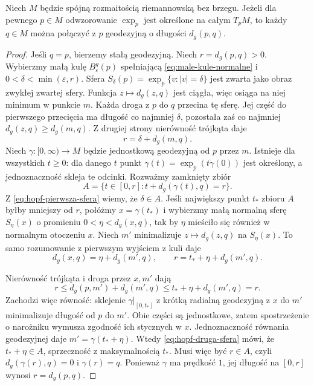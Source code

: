 \begin{lemat}
\label{lem:exp-p-minimalna-kazdy-punkt}
Niech $M$ będzie spójną rozmaitością riemannowską bez brzegu.
Jeżeli dla pewnego $p\in M$ odwzorowanie $\exp_p$ jest określone na całym $T_pM$,
to każdy $q\in M$ można połączyć z $p$
geodezyjną o długości $d_g(p,q)$.
\end{lemat}
\begin{proof}
Jeśli $q=p$, bierzemy stałą geodezyjną.
Niech $r=d_g(p,q)>0$. Wybierzmy małą
kulę $B^g_\varepsilon(p)$ spełniającą
\eqref{eq:male-kule-normalne} i
$0<\delta<\min(\varepsilon,r)$.
Sfera $S_\delta(p)=\exp_p\{v:|v|=\delta\}$
jest zwarta jako obraz zwykłej zwartej sfery.
Funkcja $z\mapsto d_g(z,q)$ jest ciągła,
więc osiąga na niej minimum w punkcie $m$.
Każda droga z $p$ do $q$ przecina tę sferę.
Jej część do pierwszego przecięcia ma długość
co najmniej $\delta$, pozostała zaś co najmniej
$d_g(z,q)\geq d_g(m,q)$. Z drugiej strony
nierówność trójkąta daje
\begin{equation}\label{eq:hopf-pierwsza-sfera}
 r=\delta+d_g(m,q).
\end{equation}
Niech $\gamma:[0,\infty)\to M$ będzie
jednostkową geodezyjną od $p$ przez $m$.
Istnieje dla wszystkich $t\geq0$: dla danego
$t$ punkt $\gamma(t)=\exp_p(t\dot\gamma(0))$
jest określony, a jednoznaczność skleja te odcinki.
Rozważmy zamknięty zbiór
\[
 A=\{t\in[0,r]:t+d_g(\gamma(t),q)=r\}.
\]
Z \eqref{eq:hopf-pierwsza-sfera} wiemy, że
$\delta\in A$. Jeśli największy punkt
$t_*$ zbioru $A$ byłby mniejszy od $r$,
połóżmy $x=\gamma(t_*)$ i wybierzmy małą
normalną sferę $S_\eta(x)$ o promieniu
$0<\eta<d_g(x,q)$, tak by $\eta$ mieściło się
również w normalnym otoczeniu $x$.
Niech $m'$ minimalizuje $z\mapsto d_g(z,q)$
na $S_\eta(x)$. To samo rozumowanie
z pierwszym wyjściem z kuli daje
\begin{equation}\label{eq:hopf-druga-sfera}
 d_g(x,q)=\eta+d_g(m',q),\qquad
 r=t_*+\eta+d_g(m',q).
\end{equation}

Nierówność trójkąta i droga przez $x,m'$ dają
\[
 r\leq d_g(p,m')+d_g(m',q)
   \leq t_*+\eta+d_g(m',q)=r.
\]
Zachodzi więc równość: sklejenie $\gamma|_{[0,t_*]}$
z krótką radialną geodezyjną z $x$ do $m'$
minimalizuje długość od $p$ do $m'$.
Obie części są jednostkowe, zatem spostrzeżenie
o narożniku wymusza zgodność ich stycznych w $x$.
Jednoznaczność równania geodezyjnej daje
$m'=\gamma(t_*+\eta)$. Wtedy
\eqref{eq:hopf-druga-sfera} mówi, że
$t_*+\eta\in A$, sprzeczność z maksymalnością
$t_*$. Musi więc być $r\in A$,
czyli $d_g(\gamma(r),q)=0$ i $\gamma(r)=q$.
Ponieważ $\gamma$ ma prędkość $1$,
jej długość na $[0,r]$ wynosi $r=d_g(p,q)$.
\end{proof}

